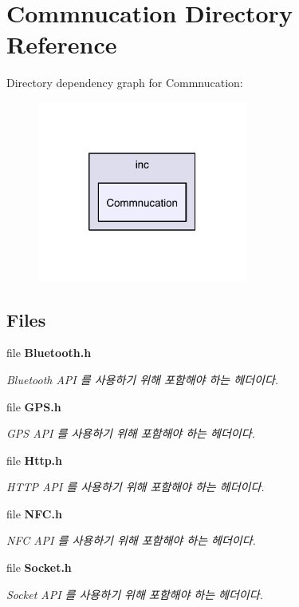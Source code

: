 \section{Commnucation Directory Reference}
\label{dir_0a03bbb93003c025bb5dd467474c2960}
Directory dependency graph for Commnucation\-:
\nopagebreak
\begin{figure}[H]
\begin{center}
\leavevmode
\includegraphics[width=196pt]{dir_0a03bbb93003c025bb5dd467474c2960_dep}
\end{center}
\end{figure}
\subsection*{Files}
\begin{DoxyCompactItemize}
\item 
file {\bf Bluetooth.\-h}
\begin{DoxyCompactList}\small\item\em Bluetooth A\-P\-I 를 사용하기 위해 포함해야 하는 헤더이다. \end{DoxyCompactList}\item 
file {\bf G\-P\-S.\-h}
\begin{DoxyCompactList}\small\item\em G\-P\-S A\-P\-I 를 사용하기 위해 포함해야 하는 헤더이다. \end{DoxyCompactList}\item 
file {\bf Http.\-h}
\begin{DoxyCompactList}\small\item\em H\-T\-T\-P A\-P\-I 를 사용하기 위해 포함해야 하는 헤더이다. \end{DoxyCompactList}\item 
file {\bf N\-F\-C.\-h}
\begin{DoxyCompactList}\small\item\em N\-F\-C A\-P\-I 를 사용하기 위해 포함해야 하는 헤더이다. \end{DoxyCompactList}\item 
file {\bf Socket.\-h}
\begin{DoxyCompactList}\small\item\em Socket A\-P\-I 를 사용하기 위해 포함해야 하는 헤더이다. \end{DoxyCompactList}\end{DoxyCompactItemize}

